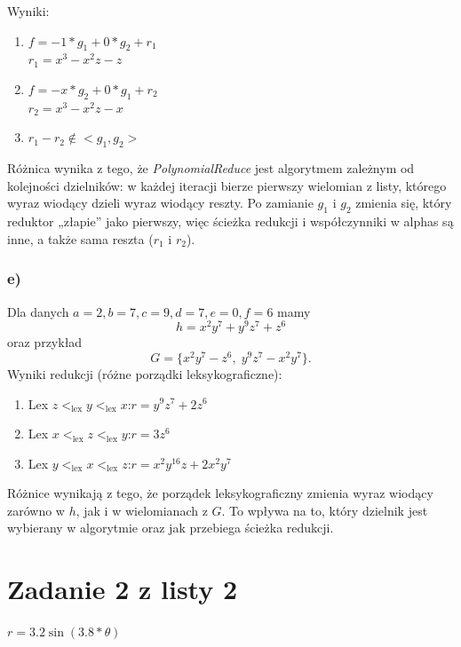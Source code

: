 \documentclass[12pt,a4paper]{article}
\begin{document}
Wyniki:
\begin{enumerate}
    \item $f=-1 * g_{1} + 0*g_{2} + r_{1}$\\$r_{1} = x^{3} - x^{2}z - z$
    \item $f=-x * g_{2} + 0*g_{1} + r_{2}$\\$r_{2} = x^{3} - x^{2}z - x$
    \item $r_{1} - r_{2} \notin <g_{1},g_{2}>$
\end{enumerate}

Różnica wynika z tego, że \textit{PolynomialReduce} jest algorytmem zależnym od kolejności dzielników: w każdej iteracji bierze pierwszy wielomian z listy, którego wyraz wiodący dzieli wyraz wiodący reszty. Po zamianie $g_{1}$ i $g_{2}$ zmienia się, który reduktor „złapie” jako pierwszy, więc ścieżka redukcji i współczynniki w alphas są inne, a także sama reszta ($r_{1}$ i $r_{2}$).

\subsubsection*{e)}
Dla danych $a = 2,b= 7,c = 9,d = 7,e = 0,f= 6$ mamy
\[
h = x^{2}y^{7} + y^{9}z^{7} + z^{6}
\]
oraz przykład
\[
G = \{x^{2}y^{7} - z^{6},\; y^{9}z^{7} - x^{2}y^{7}\}.
\]
Wyniki redukcji (różne porządki leksykograficzne):
\begin{enumerate}
    \item Lex $z<_{\mathrm{lex}}y<_{\mathrm{lex}}x$:\quad $r = y^{9}z^{7} + 2z^{6}$
    \item Lex $x<_{\mathrm{lex}}z<_{\mathrm{lex}}y$:\quad $r = 3z^{6}$
    \item Lex $y<_{\mathrm{lex}}x<_{\mathrm{lex}}z$:\quad $r = x^{2}y^{16}z + 2x^{2}y^{7}$
\end{enumerate}

Różnice wynikają z tego, że porządek leksykograficzny zmienia wyraz wiodący zarówno w $h$, jak i w wielomianach z $G$. To wpływa na to, który dzielnik jest wybierany w algorytmie oraz jak przebiega ścieżka redukcji.


\section*{Zadanie 2 z listy 2}

\def\a{0}
\def\b{3.2}
\def\m{3.8}
\def\p{0}

\begin{center}
    $r=\b \sin(\m * \theta)$
\end{center}
\end{document}
